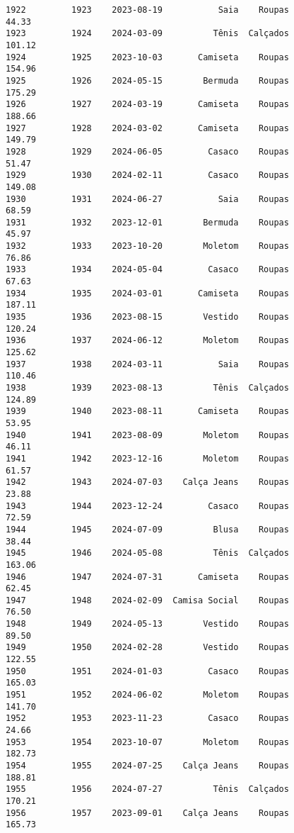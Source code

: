 \documentclass[11pt]{article}
\begin{document}
\begin{Verbatim}[commandchars=\\\{\}]
1922         1923    2023-08-19           Saia    Roupas           44.33   
1923         1924    2024-03-09          Tênis  Calçados          101.12   
1924         1925    2023-10-03       Camiseta    Roupas          154.96   
1925         1926    2024-05-15        Bermuda    Roupas          175.29   
1926         1927    2024-03-19       Camiseta    Roupas          188.66   
1927         1928    2024-03-02       Camiseta    Roupas          149.79   
1928         1929    2024-06-05         Casaco    Roupas           51.47   
1929         1930    2024-02-11         Casaco    Roupas          149.08   
1930         1931    2024-06-27           Saia    Roupas           68.59   
1931         1932    2023-12-01        Bermuda    Roupas           45.97   
1932         1933    2023-10-20        Moletom    Roupas           76.86   
1933         1934    2024-05-04         Casaco    Roupas           67.63   
1934         1935    2024-03-01       Camiseta    Roupas          187.11   
1935         1936    2023-08-15        Vestido    Roupas          120.24   
1936         1937    2024-06-12        Moletom    Roupas          125.62   
1937         1938    2024-03-11           Saia    Roupas          110.46   
1938         1939    2023-08-13          Tênis  Calçados          124.89   
1939         1940    2023-08-11       Camiseta    Roupas           53.95   
1940         1941    2023-08-09        Moletom    Roupas           46.11   
1941         1942    2023-12-16        Moletom    Roupas           61.57   
1942         1943    2024-07-03    Calça Jeans    Roupas           23.88   
1943         1944    2023-12-24         Casaco    Roupas           72.59   
1944         1945    2024-07-09          Blusa    Roupas           38.44   
1945         1946    2024-05-08          Tênis  Calçados          163.06   
1946         1947    2024-07-31       Camiseta    Roupas           62.45   
1947         1948    2024-02-09  Camisa Social    Roupas           76.50   
1948         1949    2024-05-13        Vestido    Roupas           89.50   
1949         1950    2024-02-28        Vestido    Roupas          122.55   
1950         1951    2024-01-03         Casaco    Roupas          165.03   
1951         1952    2024-06-02        Moletom    Roupas          141.70   
1952         1953    2023-11-23         Casaco    Roupas           24.66   
1953         1954    2023-10-07        Moletom    Roupas          182.73   
1954         1955    2024-07-25    Calça Jeans    Roupas          188.81   
1955         1956    2024-07-27          Tênis  Calçados          170.21   
1956         1957    2023-09-01    Calça Jeans    Roupas          165.73   

\end{Verbatim}
\end{document}
